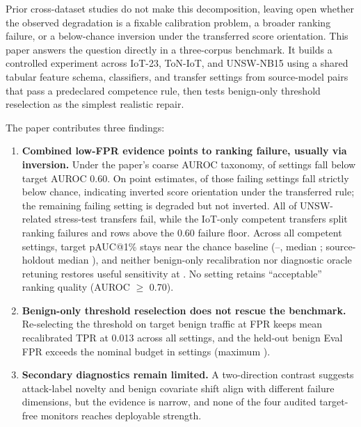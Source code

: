 \documentclass[10pt,conference]{IEEEtran}
\begin{document}
Prior cross-dataset studies do not make this decomposition, leaving open whether the observed degradation is a fixable calibration problem, a broader ranking failure, or a below-chance inversion under the transferred score orientation. This paper answers the question directly in a three-corpus benchmark. It builds a controlled experiment across IoT-23, ToN-IoT, and UNSW-NB15 using a shared tabular feature schema, \ModelCount{} classifiers, and \CompetentSettingCount{} transfer settings from source-model pairs that pass a predeclared competence rule, then tests benign-only threshold reselection as the simplest realistic repair.

The paper contributes three findings:

\begin{enumerate}
    \item \textbf{Combined low-FPR evidence points to ranking failure, usually via inversion.} Under the paper's coarse AUROC taxonomy, \CompetentRankingFailureCount{} of \CompetentSettingCount{} settings fall below target AUROC 0.60. On point estimates, \CompetentInversionCount{} of those failing settings fall strictly below chance, indicating inverted score orientation under the transferred rule; the remaining failing setting is degraded but not inverted. All \CompetentUnswStressTestRankingFailureCount{} of \CompetentUnswStressTestSettingCount{} UNSW-related stress-test transfers fail, while the \CompetentIotOnlySettingCount{} IoT-only competent transfers split \CompetentIotOnlyRankingFailureCount{} ranking failures and \CompetentIotOnlyNonCollapsedCount{} rows above the 0.60 failure floor. Across all \CompetentSettingCount{} competent settings, target pAUC@1\% stays near the chance baseline (\CompetentTargetPaucMin{}--\CompetentTargetPaucMax{}, median \CompetentTargetPaucMedian{}; source-holdout median \CompetentSourcePaucMedian{}), and neither benign-only recalibration nor diagnostic oracle retuning restores useful sensitivity at \FrozenFprTarget{}. No setting retains ``acceptable'' ranking quality (AUROC $\geq$ 0.70).
    \item \textbf{Benign-only threshold reselection does not rescue the benchmark.} Re-selecting the threshold on target benign traffic at \FrozenFprTarget{} FPR keeps mean recalibrated TPR at 0.013 across all \NaturalSettingCount{} settings, and the held-out benign Eval FPR exceeds the nominal budget in \RecalibrationEvalFprExceedanceCount{} settings (maximum \RecalibrationEvalFprMax{}).
    \item \textbf{Secondary diagnostics remain limited.} A two-direction contrast suggests attack-label novelty and benign covariate shift align with different failure dimensions, but the evidence is narrow, and none of the four audited target-free monitors reaches deployable strength.
\end{enumerate}
\end{document}
